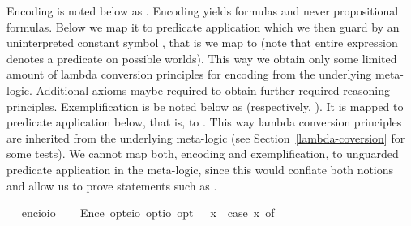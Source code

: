 \begin{isabellebody}
\begin{isamarkuptext}
  Encoding \isa{{\isasymkappa}{\isasymPi}} is noted below as \isa{{\isasymlbrace}{\isasymkappa}{\isacharcomma}{\isasymPi}{\isasymrbrace}}.
  Encoding yields formulas and never propositional formulas. Below we
  map it to predicate application \isa{{\isasymPi}{\isacharparenleft}{\isasymkappa}{\isacharparenright}} which we then guard by an uninterpreted 
  constant symbol , that is we map \isa{{\isasymlbrace}{\isasymkappa}{\isacharcomma}{\isasymPi}{\isasymrbrace}} to  (note that entire 
  expression denotes a predicate on possible worlds). This way we obtain only some limited amount of 
  lambda conversion principles for encoding from the underlying meta-logic. Additional axioms maybe required
  to obtain further required reasoning principles.
  Exemplification is be noted below as  (respectively, ).
  It is mapped to predicate application below, that is, to \isa{{\isasymPi}{\isacharparenleft}{\isasymkappa}{\isacharparenright}}. 
  This way lambda conversion principles are inherited 
  from the underlying meta-logic (see Section~\ref{lambda-coversion} for some tests).
  We cannot map both, encoding and exemplification, to unguarded predicate application in the meta-logic, since this
  would conflate both notions and allow us to prove statements such as .%
\end{isamarkuptext}\isamarkuptrue%
\ \isamarkupfalse%
\ enc{\isacharcolon}{\isacharcolon}{\isachardoublequoteopen}io{\isasymRightarrow}io{\isachardoublequoteclose}\ \isanewline
\isanewline
\ \isamarkupfalse%
\ Enc{\isacharcolon}{\isacharcolon}{\isachardoublequoteopen}e\ opt{\isasymRightarrow}{\isacharparenleft}e{\isasymRightarrow}io{\isacharparenright}\ opt{\isasymRightarrow}io\ opt{\isachardoublequoteclose}\ {\isacharparenleft}{\isachardoublequoteopen}{\isasymlbrace}{\isacharunderscore}{\isacharcomma}{\isacharunderscore}{\isasymrbrace}{\isachardoublequoteclose}{\isacharparenright}\ \ {\isachardoublequoteopen}{\isasymlbrace}x{\isacharcomma}{\isasymPhi}{\isasymrbrace}\ {\isasymequiv}\ case\ {\isacharparenleft}x{\isacharcomma}{\isasymPhi}{\isacharparenright}\ of\ \isanewline

\end{isabellebody}
